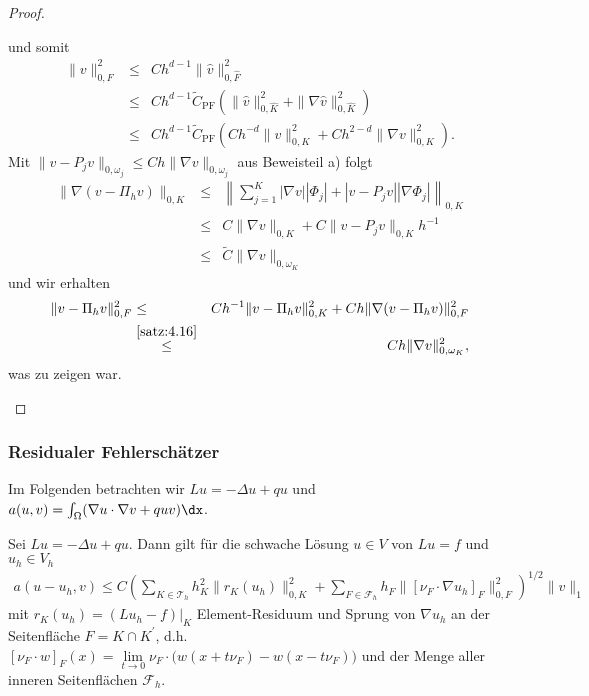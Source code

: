 \begin{proof}
\begin{enumerate}[a)]
        und somit
        \begin{eqnarray*}
                  \|v\|_{0,F}^2
            &\le& C h^{d-1} \|\hat v\|_{0,\hat F}^2 \\
            &\le& C h^{d-1} \tilde C_{\text{PF}}(\|\hat v\|_{0,\hat K}^2 +
                  \|\nabla \hat v\|_{0,\hat K}^2) \\
            &\le& C h^{d-1} \tilde C_{\text{PF}} (C h^{-d} \|v\|_{0,K}^2 + C
                  h^{2-d} \|\nabla v\|_{0,K}^2).
        \end{eqnarray*}
        Mit $\|v - P_jv\|_{0,\omega_j} \le Ch \|\nabla v\|_{0,\omega_j}$ aus
        Beweisteil a) folgt
        \begin{eqnarray*}
            \|\nabla (v - \Pi_h v)\|_{0,K}
            &\le& \left\|\sum_{j=1}^K |\nabla v| |\Phi_j| +
                  |v - P_j v| |\nabla \Phi_j|\right\|_{0,K} \\
            &\le& C \|\nabla v\|_{0,K} + C \|v - P_j v\|_{0,K} h^{-1} \\
            &\le& \tilde C \|\nabla v\|_{0,\omega_K}
        \end{eqnarray*}
        und wir erhalten
        \begin{eqnarray*}
                  \|v - \Pi_h v\|_{0,F}^2
            &\le& C h^{-1} \|v - \Pi_h v\|_{0,K}^2 +
                  C h \|\nabla (v - \Pi_h v)\|_{0,F}^2 \\
            &\stackrel{\eqref{satz:4.16}}{\le}&
                  C h \|\nabla v\|_{0,\omega_K}^2,
        \end{eqnarray*}
        was zu zeigen war.
    \end{enumerate}    
\end{proof}


\subsubsection{Residualer Fehlerschätzer}



Im Folgenden betrachten wir $Lu = -\Delta u + qu$ und
$a(u, v) = \int_\Omega (\nabla u \cdot \nabla v + q u v) \dx$. 

\begin{Lemma}
    \label{lem:4.17}
    Sei $Lu = -\Delta u + q u$. Dann gilt für die schwache Lösung $u\in  V$ 
    von $Lu = f$ und $u_h\in V_h$
    \begin{eqnarray*}
            a(u - u_h, v)
        \le C \left(\sum_{K\in \mathcal T_h} h_K^2 \|r_K(u_h)\|_{0,K}^2 +
            \sum_{F\in \mathcal F_h} h_F\| [\nu_F \cdot \nabla u_h]_F
            \|_{0,F}^2\right)^{1/2} \| v \|_1
    \end{eqnarray*}
    mit $r_K(u_h) = (L u_h - f)|_K$ Element-Residuum und Sprung von $\nabla u_h$
    an der Seitenfläche $F = K \cap K^\prime$, d.h.
    $[\nu_F \cdot w]_F (x) = \lim\limits_{t\to 0} \nu_F \cdot \big(w(x + t\nu_F)
    - w(x - t\nu_F)\big)$ und der Menge aller inneren Seitenflächen
    $\mathcal{F}_h$.
\end{Lemma}


